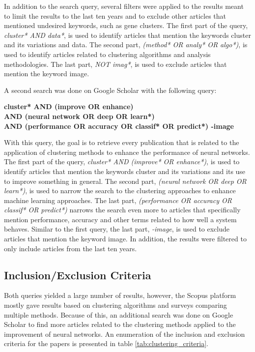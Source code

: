 In addition to the search query, several filters were applied to the results meant to limit the results to the last ten years and to exclude other articles that mentioned undesired keywords, such as gene clusters. The first part of the query, \textit{cluster* AND data*}, is used to identify articles that mention the keywords cluster and its variations and data. The second part, \textit{(method* OR analy* OR algo*)}, is used to identify articles related to clustering algorithms and analysis methodologies. The last part, \textit{NOT imag*}, is used to exclude articles that mention the keyword image.

A second search was done on Google Scholar with the following query:
\begin{center}
    \textbf{cluster* AND (improve OR enhance) \\AND (neural network OR deep OR learn*) \\AND (performance OR accuracy OR classif* OR predict*) -image}
\end{center}

With this query, the goal is to retrieve every publication that is related to the application of clustering methods to enhance the performance of neural networks. The first part of the query, \textit{cluster* AND (improve* OR enhance*)}, is used to identify articles that mention the keywords cluster and its variations and its use to improve something in general. The second part, \textit{(neural network OR deep OR learn*)}, is used to narrow the search to the clustering approaches to enhance machine learning approaches. The last part, \textit{(performance OR accuracy OR classif* OR predict*)} narrows the search even more to articles that specifically mention performance, accuracy and other terms related to how well a system behaves. Similar to the first query, the last part, \textit{-image}, is used to exclude articles that mention the keyword image. In addition, the results were filtered to only include articles from the last ten years.


\subsection{Inclusion/Exclusion Criteria}\label{sec:cluster_inclusion_exclusion}
Both queries yielded a large number of results, however, the Scopus platform mostly gave results based on clustering algorithms and surveys comparing multiple methods. Because of this, an additional search was done on Google Scholar to find more articles related to the clustering methods applied to the improvement of neural networks. An enumeration of the inclusion and exclusion criteria for the papers is presented in table \ref{tab:clustering_criteria}.

